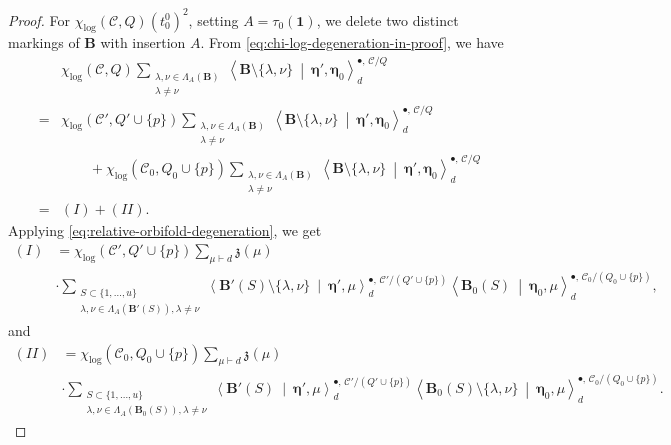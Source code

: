 \documentclass[10pt,a4paper]{amsart}
\newcommand{\cC}{\mathcal C}
\newcommand{\id}{\mathbf 1}
\begin{document}
\begin{proof}
For \(\chi_{\log}(\cC,Q)(t^0_0)^2\), setting \(A=\tau_0(\id)\), we delete two distinct markings of \(\mathbf B\) with insertion
\(A\).  From \eqref{eq:chi-log-degeneration-in-proof}, we have
\begin{align*}
    &\chi_{\log}(\cC,Q)
 \sum_{\substack{\lambda,\nu\in\Lambda_A(\mathbf B)\\ \lambda\ne\nu}}
 \left\langle\mathbf B\setminus\{\lambda,\nu\}
 \ \middle|\ \boldsymbol\eta',\boldsymbol\eta_0\right\rangle_d^{\bullet,\,\cC/Q}\\
 ={}&\chi_{\log}(\cC',Q'\cup\{p\})
 \sum_{\substack{\lambda,\nu\in\Lambda_A(\mathbf B)\\ \lambda\ne\nu}}
 \left\langle\mathbf B\setminus\{\lambda,\nu\}
 \ \middle|\ \boldsymbol\eta',\boldsymbol\eta_0\right\rangle_d^{\bullet,\,\cC/Q}\\
 &\qquad+\chi_{\log}(\cC_0,Q_0\cup\{p\})
 \sum_{\substack{\lambda,\nu\in\Lambda_A(\mathbf B)\\ \lambda\ne\nu}}
 \left\langle\mathbf B\setminus\{\lambda,\nu\}
 \ \middle|\ \boldsymbol\eta',\boldsymbol\eta_0\right\rangle_d^{\bullet,\,\cC/Q}\\
 ={}&(I)+(II).
\end{align*}
Applying \eqref{eq:relative-orbifold-degeneration}, we get
\begin{align*}
    (I)&=\chi_{\log}(\cC',Q'\cup\{p\})\sum_{\mu\vdash d}\mathfrak z(\mu)\\
    &\cdot\sum_{\substack{S\subset\{1,\ldots,u\}\\\lambda,\nu\in\Lambda_A(\mathbf B'(S)), \lambda\ne\nu}}
 \left\langle\mathbf B'(S)\setminus\{\lambda,\nu\}
 \ \middle|\ \boldsymbol\eta',\mu\right\rangle_d^{\bullet,\,\cC'/(Q'\cup\{p\})}
 \left\langle\mathbf B_0(S)\ \middle|\ \boldsymbol\eta_0,\mu\right\rangle_d^{\bullet,\,\cC_0/(Q_0\cup\{p\})},
\end{align*}
and 
\begin{align*}
    (II)&=\chi_{\log}(\cC_0,Q_0\cup\{p\})\sum_{\mu\vdash d}\mathfrak z(\mu)\\
    &\cdot\sum_{\substack{S\subset\{1,\ldots,u\}\\\lambda,\nu\in\Lambda_A(\mathbf B_0(S)), \lambda\ne\nu}}
 \left\langle\mathbf B'(S)
 \ \middle|\ \boldsymbol\eta',\mu\right\rangle_d^{\bullet,\,\cC'/(Q'\cup\{p\})}
 \left\langle\mathbf B_0(S)\setminus\{\lambda,\nu\}\ \middle|\ \boldsymbol\eta_0,\mu\right\rangle_d^{\bullet,\,\cC_0/(Q_0\cup\{p\})}.
\end{align*}


\end{proof}
\end{document}
